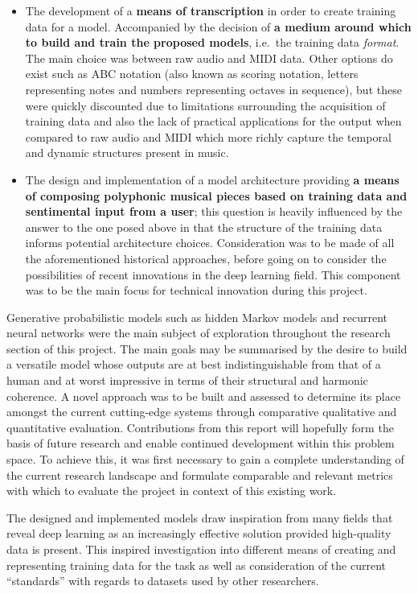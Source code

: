 \documentclass[12pt,]{article}
\providecommand{\tightlist}{%
  \setlength{\itemsep}{0pt}\setlength{\parskip}{0pt}}
\begin{document}
\begin{itemize}
\tightlist
\item
  The development of a \textbf{means of transcription} in order to
  create training data for a model. Accompanied by the decision of
  \textbf{a medium around which to build and train the proposed models},
  i.e.~the training data \emph{format}. The main choice was between raw
  audio and MIDI data. Other options do exist such as ABC notation (also
  known as scoring notation, letters representing notes and numbers
  representing octaves in sequence), but these were quickly discounted
  due to limitations surrounding the acquisition of training data and
  also the lack of practical applications for the output when compared
  to raw audio and MIDI which more richly capture the temporal and
  dynamic structures present in music.
\item
  The design and implementation of a model architecture providing
  \textbf{a means of composing polyphonic musical pieces based on
  training data and sentimental input from a user}; this question is
  heavily influenced by the answer to the one posed above in that the
  structure of the training data informs potential architecture choices.
  Consideration was to be made of all the aforementioned historical
  approaches, before going on to consider the possibilities of recent
  innovations in the deep learning field. This component was to be the
  main focus for technical innovation during this project.
\end{itemize}

Generative probabilistic models such as hidden Markov models and
recurrent neural networks were the main subject of exploration
throughout the research section of this project. The main goals may be
summarised by the desire to build a versatile model whose outputs are at
best indistinguishable from that of a human and at worst impressive in
terms of their structural and harmonic coherence. A novel approach was
to be built and assessed to determine its place amongst the current
cutting-edge systems through comparative qualitative and quantitative
evaluation. Contributions from this report will hopefully form the basis
of future research and enable continued development within this problem
space. To achieve this, it was first necessary to gain a complete
understanding of the current research landscape and formulate comparable
and relevant metrics with which to evaluate the project in context of
this existing work.

The designed and implemented models draw inspiration from many fields
that reveal deep learning as an increasingly effective solution provided
high-quality data is present. This inspired investigation into different
means of creating and representing training data for the task as well as
consideration of the current ``standards'' with regards to datasets used
by other researchers.
\end{document}
